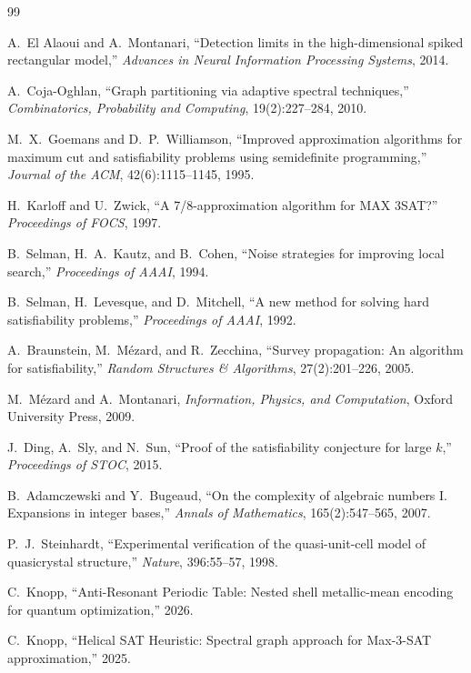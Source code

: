 \documentclass[11pt,a4paper]{article}
\begin{document}
\begin{thebibliography}{99}

A.~El Alaoui and A.~Montanari,
``Detection limits in the high-dimensional spiked rectangular model,''
\emph{Advances in Neural Information Processing Systems}, 2014.

A.~Coja-Oghlan,
``Graph partitioning via adaptive spectral techniques,''
\emph{Combinatorics, Probability and Computing}, 19(2):227--284, 2010.

M.~X.~Goemans and D.~P.~Williamson,
``Improved approximation algorithms for maximum cut and satisfiability
problems using semidefinite programming,''
\emph{Journal of the ACM}, 42(6):1115--1145, 1995.

H.~Karloff and U.~Zwick,
``A 7/8-approximation algorithm for MAX 3SAT?''
\emph{Proceedings of FOCS}, 1997.

B.~Selman, H.~A.~Kautz, and B.~Cohen,
``Noise strategies for improving local search,''
\emph{Proceedings of AAAI}, 1994.

B.~Selman, H.~Levesque, and D.~Mitchell,
``A new method for solving hard satisfiability problems,''
\emph{Proceedings of AAAI}, 1992.

A.~Braunstein, M.~M\'ezard, and R.~Zecchina,
``Survey propagation: An algorithm for satisfiability,''
\emph{Random Structures \& Algorithms}, 27(2):201--226, 2005.

M.~M\'ezard and A.~Montanari,
\emph{Information, Physics, and Computation},
Oxford University Press, 2009.

J.~Ding, A.~Sly, and N.~Sun,
``Proof of the satisfiability conjecture for large $k$,''
\emph{Proceedings of STOC}, 2015.

B.~Adamczewski and Y.~Bugeaud,
``On the complexity of algebraic numbers I. Expansions in integer bases,''
\emph{Annals of Mathematics}, 165(2):547--565, 2007.

P.~J.~Steinhardt,
``Experimental verification of the quasi-unit-cell model of quasicrystal
structure,'' \emph{Nature}, 396:55--57, 1998.

C.~Knopp,
``Anti-Resonant Periodic Table: Nested shell metallic-mean encoding for
quantum optimization,'' 2026.

C.~Knopp,
``Helical SAT Heuristic: Spectral graph approach for Max-3-SAT
approximation,'' 2025.

\end{thebibliography}
\end{document}
